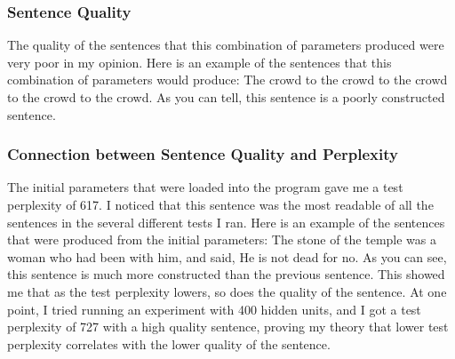 \documentclass[a4paper]{article}
\begin{document}
\subsubsection{Sentence Quality}
The quality of the sentences that this combination of parameters produced were very poor in my opinion. Here is an example of the sentences that this combination of parameters would produce: The crowd to the crowd to the crowd to the crowd to the crowd. As you can tell, this sentence is a poorly constructed sentence.

\subsubsection{Connection between Sentence Quality and Perplexity}
The initial parameters that were loaded into the program gave me a test perplexity of 617. I noticed that this sentence was the most readable of all the sentences in the several different tests I ran. Here is an example of the sentences that were produced from the initial parameters: The stone of the temple was a woman who had been with him, and said, He is not dead for no. As you can see, this sentence is much more constructed than the previous sentence. This showed me that as the test perplexity lowers, so does the quality of the sentence. At one point, I tried running an experiment with 400 hidden units, and I got a test perplexity of 727 with a high quality sentence, proving my theory that lower test perplexity correlates with the lower quality of the sentence.
\end{document}
